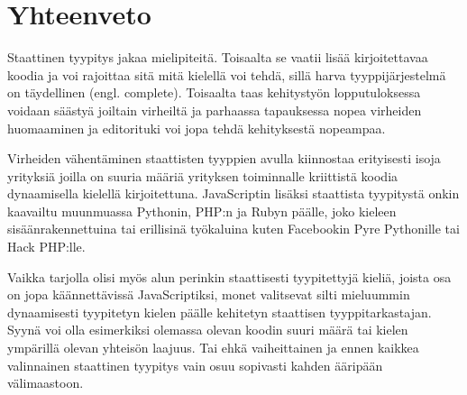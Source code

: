\chapter{Yhteenveto}
Staattinen tyypitys jakaa mielipiteitä. Toisaalta se vaatii lisää
kirjoitettavaa koodia ja voi rajoittaa sitä mitä kielellä voi tehdä, sillä
harva tyyppijärjestelmä on täydellinen (engl. complete). Toisaalta taas
kehitystyön lopputuloksessa voidaan säästyä joiltain virheiltä ja parhaassa
tapauksessa nopea virheiden huomaaminen ja editorituki voi jopa tehdä
kehityksestä nopeampaa.

Virheiden vähentäminen staattisten tyyppien avulla kiinnostaa erityisesti
isoja yrityksiä joilla on suuria määriä yrityksen toiminnalle kriittistä
koodia dynaamisella kielellä kirjoitettuna. JavaScriptin lisäksi staattista
tyypitystä onkin kaavailtu muunmuassa Pythonin, PHP:n ja Rubyn päälle, joko
kieleen sisäänrakennettuina  tai erillisinä
työkaluina kuten Facebookin Pyre Pythonille tai Hack PHP:lle.

Vaikka tarjolla olisi myös alun perinkin staattisesti tyypitettyjä kieliä,
joista osa on jopa käännettävissä JavaScriptiksi, monet valitsevat silti
mieluummin dynaamisesti tyypitetyn kielen päälle kehitetyn staattisen
tyyppitarkastajan. Syynä voi olla esimerkiksi olemassa olevan koodin suuri
määrä tai kielen ympärillä olevan yhteisön laajuus. Tai ehkä vaiheittainen ja
ennen kaikkea valinnainen staattinen tyypitys vain osuu sopivasti kahden
ääripään välimaastoon.
